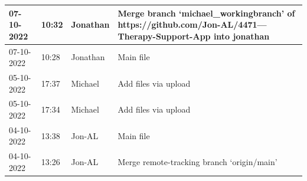 \documentclass[11pt]{article}
\begin{document}
\begin{center}
\begin{longtable}{|p{2cm}|l|p{2cm}|p{10.5cm}|}
            07-10-2022                                 & 10:32                              & Jonathan                                & Merge branch `michael\_workingbranch' of https://github.com/Jon-AL/4471---Therapy-Support-App into jonathan                                                                                                                                                                                                  \\ \hline
            07-10-2022                                 & 10:28                              & Jonathan                                & Main file                                                                                                                                                                                                                                                                                                    \\ \hline
            05-10-2022                                 & 17:37                              & Michael                                 & Add files via upload                                                                                                                                                                                                                                                                                         \\ \hline
            05-10-2022                                 & 17:34                              & Michael                                 & Add files via upload                                                                                                                                                                                                                                                                                         \\ \hline
            04-10-2022                                 & 13:38                              & Jon-AL                                  & Main file                                                                                                                                                                                                                                                                                                    \\ \hline
            04-10-2022                                 & 13:26                              & Jon-AL                                  & Merge remote-tracking branch `origin/main'                                                                                                                                                                                                                                                                   \\ \hline

\end{longtable}
\end{center}
\end{document}
